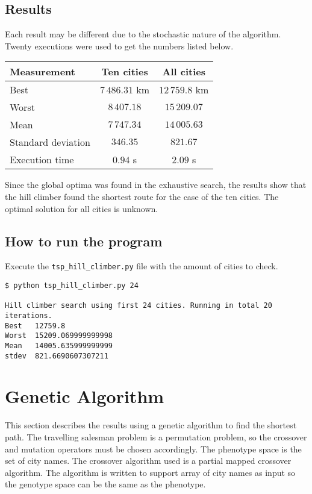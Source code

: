 \documentclass{article}
\begin{document}
\subsection*{Results}

Each result may be different due to the stochastic nature of the algorithm. Twenty executions were used to get the numbers listed below.

\begin{center}
\begin{tabular}{lcc}
\toprule
Measurement & Ten cities & All cities \\
\midrule
Best & $7\,486.31$ km & $12\,759.8$ km \\
Worst & $8\,407.18$ & $15\,209.07$ \\
Mean & $7\,747.34$ & $14\,005.63$ \\
Standard deviation & $346.35$ & $821.67$ \\
Execution time & $0.94$ s & $2.09$ s \\
\bottomrule
\end{tabular}
\end{center}

\noindent Since the global optima was found in the exhaustive search, the results show that the hill climber found the shortest route for the case of the ten cities. The optimal solution for all cities is unknown.

\subsection*{How to run the program}

Execute the \texttt{tsp\_hill\_climber.py} file with the amount of cities to check.

\begin{verbatim}
$ python tsp_hill_climber.py 24

Hill climber search using first 24 cities. Running in total 20
iterations.
Best   12759.8
Worst  15209.069999999998
Mean   14005.635999999999
stdev  821.6690607307211
\end{verbatim}

\section*{Genetic Algorithm}

This section describes the results using a genetic algorithm to find the shortest path. The travelling salesman problem is a permutation problem, so the crossover and mutation operators must be chosen accordingly. The phenotype space is the set of city names. The crossover algorithm used is a partial mapped crossover algorithm. The algorithm is written to support array of city names as input so the genotype space can be the same as the phenotype.
\end{document}
